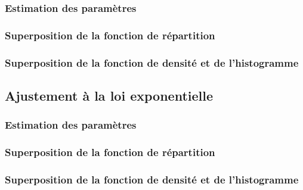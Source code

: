 \documentclass{article}
\begin{document}
\subsubsection{Estimation des paramètres}
\subsubsection{Superposition de la fonction de répartition}
\subsubsection{Superposition de la fonction de densité et de l'histogramme}

\subsection {Ajustement à la loi exponentielle}

\subsubsection{Estimation des paramètres}
\subsubsection{Superposition de la fonction de répartition}
\subsubsection{Superposition de la fonction de densité et de l'histogramme}

\newpage
\appendix

\section{}

\subsection{}

\subsubsection{}

\begin{verbatim}
\end{verbatim}
\end{document}
